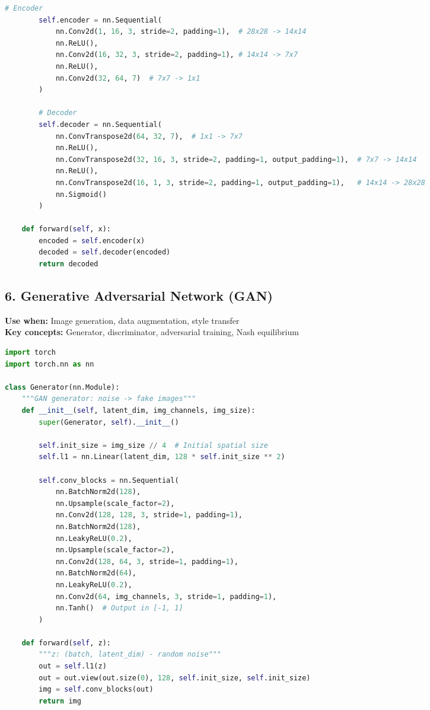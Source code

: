 \documentclass[8pt,landscape]{article}
\begin{document}
\begin{multicols}{3}
\begin{lstlisting}[language=Python]
        # Encoder
        self.encoder = nn.Sequential(
            nn.Conv2d(1, 16, 3, stride=2, padding=1),  # 28x28 -> 14x14
            nn.ReLU(),
            nn.Conv2d(16, 32, 3, stride=2, padding=1), # 14x14 -> 7x7
            nn.ReLU(),
            nn.Conv2d(32, 64, 7)  # 7x7 -> 1x1
        )

        # Decoder
        self.decoder = nn.Sequential(
            nn.ConvTranspose2d(64, 32, 7),  # 1x1 -> 7x7
            nn.ReLU(),
            nn.ConvTranspose2d(32, 16, 3, stride=2, padding=1, output_padding=1),  # 7x7 -> 14x14
            nn.ReLU(),
            nn.ConvTranspose2d(16, 1, 3, stride=2, padding=1, output_padding=1),   # 14x14 -> 28x28
            nn.Sigmoid()
        )

    def forward(self, x):
        encoded = self.encoder(x)
        decoded = self.decoder(encoded)
        return decoded
\end{lstlisting}

\subsection*{6. Generative Adversarial Network (GAN)}
\textbf{Use when:} Image generation, data augmentation, style transfer \\
\textbf{Key concepts:} Generator, discriminator, adversarial training, Nash equilibrium
\begin{lstlisting}[language=Python]
import torch
import torch.nn as nn

class Generator(nn.Module):
    """GAN generator: noise -> fake images"""
    def __init__(self, latent_dim, img_channels, img_size):
        super(Generator, self).__init__()

        self.init_size = img_size // 4  # Initial spatial size
        self.l1 = nn.Linear(latent_dim, 128 * self.init_size ** 2)

        self.conv_blocks = nn.Sequential(
            nn.BatchNorm2d(128),
            nn.Upsample(scale_factor=2),
            nn.Conv2d(128, 128, 3, stride=1, padding=1),
            nn.BatchNorm2d(128),
            nn.LeakyReLU(0.2),
            nn.Upsample(scale_factor=2),
            nn.Conv2d(128, 64, 3, stride=1, padding=1),
            nn.BatchNorm2d(64),
            nn.LeakyReLU(0.2),
            nn.Conv2d(64, img_channels, 3, stride=1, padding=1),
            nn.Tanh()  # Output in [-1, 1]
        )

    def forward(self, z):
        """z: (batch, latent_dim) - random noise"""
        out = self.l1(z)
        out = out.view(out.size(0), 128, self.init_size, self.init_size)
        img = self.conv_blocks(out)
        return img


\end{lstlisting}
\end{multicols}
\end{document}
